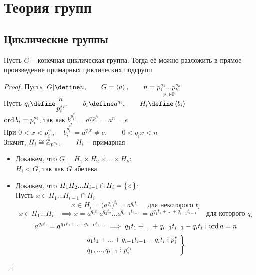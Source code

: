 \chapter{Теория групп}

\section{Циклические группы}

\begin{theorem}
	Пусть $ G $ -- конечная циклическая группа. Тогда её можно разложить в прямое произведение примарных циклических подгрупп
\end{theorem}

\begin{proof}
    Пусть $ |G| \define n, \qquad G = \braket{a}, \qquad n = \underset{p_i \in \Prime}{p_1^{s_1}...p_k^{s_k}} $ \\
    Пусть $ q_i \define \dfrac{n}{p_i^{s_i}}, \qquad b_i \define a^{q_i}, \qquad H_i \define \braket{b_i} $ \\
    $ \ord b_i = p_i^{s_i} $, так как $ b_i^{p_i^{s_i}} = a^{q_ip_i^{s_i}} = a^n = e $ \\
    При $ 0 < x < p_i^{s_i} $, $ \quad b_i^{p_i^{s_i}} = a^{q_ix} \ne e, \qquad 0 < q_ix < n $ \\
    Значит, $ H_i \cong \Z_{p^{s_i}}, \qquad H_i $ -- примарная
    \begin{itemize}
    	\item Докажем, что $ G = H_1 \times H_2 \times ... \times H_k $: \\
        $ H_i \vartriangleleft G $, так как $ G $ абелева
        \item Докажем, что $ H_1H_2...H_{i - 1} \cap H_i = \set{e} $: \\
        Пусть $ x \in H_1...H_{i - 1} \cap H_i $
        $$ x \in H_i = \big( a^{q_i} \big)^{t_i} = a^{q_it_i} \quad \text{ для некоторого } t_i $$
        $$ x \in H_1...H_{i - } \implies x = a^{q_1t_1}a^{q_2t_2}...a^{q_{i - 1}t_{i - 1}} = a^{q_1t_1 + ... + q_{i - 1}t_{i - 1}} \quad \text{ для которого } q_i $$
        $$ a^{q_it_i} = a^{q_1t_1 + ... + q_{i - 1}t_{i - 1}} \implies q_1t_1 + ... + q_{i - 1}t_{i - 1} - q_it_i \divby \ord a = n $$
        $$
        \begin{rcases}
            q_1t_1 + ... + q_{i - 1}t_{i - 1} - q_it_i \divby p_i^{s_i} \\
            q_1, ..., q_{i - 1} \divby p_i^{s_i}

\end{rcases}$$
\end{itemize}
\end{proof}
